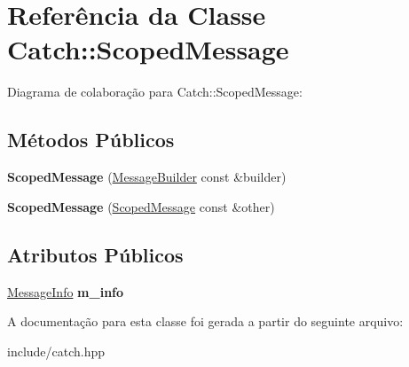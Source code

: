 \hypertarget{classCatch_1_1ScopedMessage}{}\section{Referência da Classe Catch\+:\+:Scoped\+Message}
\label{classCatch_1_1ScopedMessage}


Diagrama de colaboração para Catch\+:\+:Scoped\+Message\+:
\subsection*{Métodos Públicos}
\begin{DoxyCompactItemize}
\item 
{\bfseries Scoped\+Message} (\hyperlink{structCatch_1_1MessageBuilder}{Message\+Builder} const \&builder)\hypertarget{classCatch_1_1ScopedMessage_a5cc59f0f2ebe840e6607f83004d49a17}{}\label{classCatch_1_1ScopedMessage_a5cc59f0f2ebe840e6607f83004d49a17}

\item 
{\bfseries Scoped\+Message} (\hyperlink{classCatch_1_1ScopedMessage}{Scoped\+Message} const \&other)\hypertarget{classCatch_1_1ScopedMessage_ae03a17fd47220d563d4abc73e7518e29}{}\label{classCatch_1_1ScopedMessage_ae03a17fd47220d563d4abc73e7518e29}

\end{DoxyCompactItemize}
\subsection*{Atributos Públicos}
\begin{DoxyCompactItemize}
\item 
\hyperlink{structCatch_1_1MessageInfo}{Message\+Info} {\bfseries m\+\_\+info}\hypertarget{classCatch_1_1ScopedMessage_ae6e1476f389cc6e1586f033b3747b27b}{}\label{classCatch_1_1ScopedMessage_ae6e1476f389cc6e1586f033b3747b27b}

\end{DoxyCompactItemize}


A documentação para esta classe foi gerada a partir do seguinte arquivo\+:\begin{DoxyCompactItemize}
\item 
include/catch.\+hpp\end{DoxyCompactItemize}
